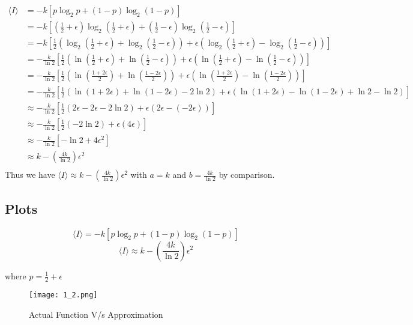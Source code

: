 \documentclass{article}
\begin{document}
\begin{equation*}
  \begin{aligned}
    \langle I \rangle &= -k[p\log_2{p} + (1-p)\log_2{(1-p)}]\\
    &= -k[(\frac{1}{2} + \epsilon)\log_2{(\frac{1}{2} + \epsilon)} + (\frac{1}{2} - \epsilon)\log_2{(\frac{1}{2} - \epsilon)}]\\
    &= -k[\frac{1}{2}(\log_2{(\frac{1}{2} + \epsilon)} + \log_2{(\frac{1}{2} - \epsilon)}) + \epsilon (\log_2{(\frac{1}{2} + \epsilon)} - \log_2{(\frac{1}{2} - \epsilon)})]\\
    &= -\frac{k}{\ln2}[\frac{1}{2}(\ln{(\frac{1}{2} + \epsilon)} + \ln{(\frac{1}{2} - \epsilon)}) + \epsilon (\ln{(\frac{1}{2} + \epsilon)} - \ln{(\frac{1}{2} - \epsilon)})]\\
    &= -\frac{k}{\ln2}[\frac{1}{2}(\ln{(\frac{1+2\epsilon}{2})} + \ln{(\frac{1-2\epsilon}{2})}) + \epsilon (\ln{(\frac{1+2\epsilon}{2})} - \ln{(\frac{1-2\epsilon}{2})})]\\
    &= -\frac{k}{\ln2}[\frac{1}{2}(\ln{(1+2\epsilon)} + \ln{(1-2\epsilon)} - 2\ln2) + \epsilon (\ln{(1+2\epsilon)} - \ln{(1-2\epsilon)} + \ln2-\ln2)]\\
    &\approx -\frac{k}{\ln2}[\frac{1}{2}(2\epsilon -2\epsilon - 2\ln2) + \epsilon (2\epsilon - (-2\epsilon))]\\
    &\approx -\frac{k}{\ln2}[\frac{1}{2}(-2\ln2) + \epsilon (4\epsilon)]\\
    &\approx -\frac{k}{\ln2}[-\ln2 + 4\epsilon^2]\\
    &\approx k-(\frac{4k}{\ln2})\epsilon^2\\
  \end{aligned}
\end{equation*}
\newline
\newline
Thus we have $\langle I \rangle \approx k-(\frac{4k}{\ln2})\epsilon^2$ with $a = k$ and $b = \frac{4k}{\ln2}$ by comparison.

\newpage
\subsection{Plots}
$$\langle I \rangle = -k[p\log_2{p} + (1-p)\log_2{(1-p)}]$$
$$\langle I \rangle \approx k-(\frac{4k}{\ln2})\epsilon^2$$
\begin{center} where $p = \frac{1}{2} + \epsilon$ \end{center}

\begin{figure}[!h]
    \centering
    \texttt{[image: 1\_2.png]}
    \caption{Actual Function V/s Approximation}
\end{figure}
\newpage
\end{document}

